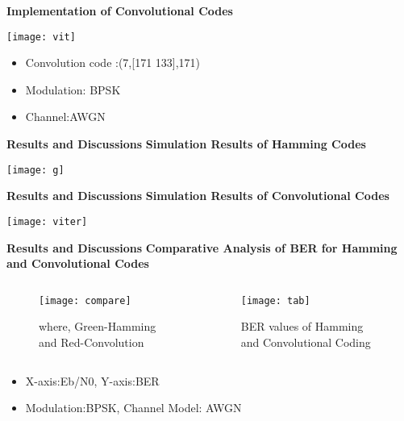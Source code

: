 \documentclass{beamer}
\begin{document}
\begin{frame}{\scriptsize \LARGE \centering \textbf{Implementation of Convolutional Codes}}
\begin{center}
	\texttt{[image: vit]}
\end{center}
\begin{itemize}
	\item Convolution code :(7,[171 133],171)
	\item Modulation: BPSK
	\item Channel:AWGN
\end{itemize}
\end{frame}

\begin{frame}{\scriptsize \LARGE \centering \textbf{Results and Discussions}}
\textbf{Simulation Results of Hamming Codes}
\begin{center}
\texttt{[image: g]}
\end{center}
\end{frame}

\begin{frame}{\scriptsize \LARGE \centering \textbf{Results and Discussions}}
\textbf{Simulation Results of Convolutional Codes}
\begin{center}
\texttt{[image: viter]}
\end{center}
\end{frame}

\begin{frame}{\scriptsize \LARGE \centering \textbf{Results and Discussions}}
\textbf{Comparative Analysis of BER for Hamming and Convolutional Codes}
\begin{columns}
\begin{column}{7cm}
\begin{center}
\begin{figure}
\texttt{[image: compare]}
\caption{where, Green-Hamming and Red-Convolution}
\end{figure}
\end{center}
\end{column}
\begin{column}{4cm}
\begin{center}
\begin{figure}
\texttt{[image: tab]}
\caption{BER values of Hamming and Convolutional Coding}
\end{figure}
\end{center}
\end{column}
\end{columns}
\begin{itemize}
\item X-axis:Eb/N0, Y-axis:BER 
\item Modulation:BPSK, Channel Model: AWGN
\end{itemize}
\end{frame}
\end{document}
